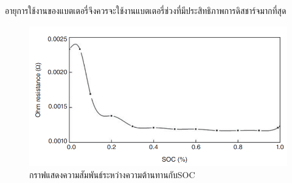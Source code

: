 อายุการใช้งานของแบตเตอรี่จึงควรจะใช้งานแบตเตอรี่ช่วงที่มีประสิทธิภาพการดิสชาร์จมากที่สุด
\begin{center}
	\begin{figure}[H]
		\includegraphics[width=0.6\linewidth]{Chapters/img/Resistance_vs_SOC.png}
			\centering
			\captionsetup{justification=centering,margin=2cm}
			\caption{กราฟแสดงความสัมพันธ์ระหว่างความต้านทานกับSOC}
	\end{figure}
\end{center}
